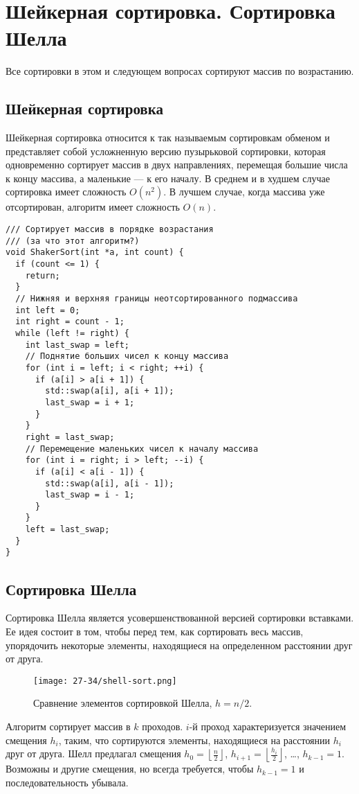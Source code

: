 \newcommand{\asgn}{\gets\,}
\newenvironment{landscape}{%
\newgeometry{textwidth=\textheight,textheight=\textwidth,left=15mm,top=15mm}%
\eject\pagewidth=297mm\pageheight=210mm%
}{%
\restoregeometry%
\eject\pagewidth=210mm\pageheight=297mm%
}

\section{Шейкерная сортировка. Сортировка Шелла}
Все сортировки в этом и следующем вопросах сортируют массив по возрастанию.
\subsection{Шейкерная сортировка}
Шейкерная сортировка относится к так называемым сортировкам обменом и представляет
собой усложненную версию пузырьковой сортировки, которая одновременно сортирует массив
в двух направлениях, перемещая большие числа к концу массива, а маленькие --- к его началу.
В среднем и в худшем случае сортировка имеет сложность $O(n^2)$. В лучшем случае, когда
массива уже отсортирован, алгоритм имеет сложность $O(n)$.

\begin{verbatim}
/// Сортирует массив в порядке возрастания
/// (за что этот алгоритм?)
void ShakerSort(int *a, int count) {
  if (count <= 1) {
    return;
  }
  // Нижняя и верхняя границы неотсортированного подмассива
  int left = 0;
  int right = count - 1;
  while (left != right) {
    int last_swap = left;
    // Поднятие больших чисел к концу массива
    for (int i = left; i < right; ++i) {
      if (a[i] > a[i + 1]) {
        std::swap(a[i], a[i + 1]);
        last_swap = i + 1;
      }
    }
    right = last_swap;
    // Перемещение маленьких чисел к началу массива
    for (int i = right; i > left; --i) {
      if (a[i] < a[i - 1]) {
        std::swap(a[i], a[i - 1]);
        last_swap = i - 1;
      }
    }
    left = last_swap;
  }
}  
\end{verbatim}

\subsection{Сортировка Шелла}
Сортировка Шелла является усовершенствованной версией сортировки вставками. Ее идея состоит
в том, чтобы перед тем, как сортировать весь массив, упорядочить некоторые элементы,
находящиеся на определенном расстоянии друг от друга.
\begin{figure}
  \begin{center}
  \texttt{[image: 27-34/shell-sort.png]}
  \end{center}
  \caption{Сравнение элементов сортировкой Шелла, $h=n/2$.}
\end{figure}
Алгоритм сортирует массив в $k$ проходов. $i$-й проход характеризуется
значением смещения $h_i$, таким, что сортируются элементы, находящиеся на расстоянии
$h_i$ друг от друга. Шелл предлагал смещения $h_0 = \left\lfloor\tfrac{n}{2}\right\rfloor$,
$h_{i+1} = \left\lfloor\tfrac{h_i}{2}\right\rfloor$,
\dots, $h_{k-1} = 1$. Возможны и другие смещения, но всегда требуется, чтобы $h_{k-1} = 1$
и последовательность убывала.

